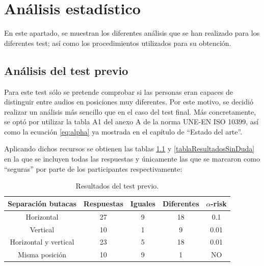 \documentclass[11pt,a4paper,twoside]{book}
\author{Víctor de Tejada Molera}
\begin{document}
\chapter{Análisis estadístico}    
    
    En este apartado, se muestran los diferentes análisis que se han realizado para los diferentes test; así como los procedimientos utilizados para su obtención.
        
    \section{Análisis del test previo}
        Para este test sólo se pretende comprobar si las personas eran capaces de distinguir entre audios en posiciones muy diferentes. Por este motivo, se decidió realizar un análisis más sencillo que en el caso del test final. Más concretamente, se optó por utilizar la tabla A1 del anexo A de la norma UNE-EN ISO 10399, así como la ecuación \ref{eq:alpha} ya mostrada en el capítulo de ``Estado del arte''.
            
        Aplicando dichos recursos se obtienen las tablas \ref{tablaResultadosDuda} y \ref{tablaResultadosSinDuda} en la que se incluyen todas las respuestas y únicamente las que se marcaron como ``seguras'' por parte de los participantes respectivamente:
            
        \begin{table}
	    \begin{center}
		\begin{scriptsize}
		\begin{tabular}{| c | c | c | c || c |}
			\hline
			\textbf{Separación butacas}&\textbf{Respuestas}&\textbf{Iguales}&\textbf{Diferentes}&\textbf{$\alpha$-risk}\\ \hline
            Horizontal&27&9&18&0.1\\ \hline
            Vertical&10&1&9&0.01\\ \hline
            Horizontal y vertical&23
            &5&18&0.01\\ \hline
            Misma posición&10&9&1&NO\\ \hline
		\end{tabular}
		\caption{Resultados del test previo.}
		\label{tablaResultadosDuda}
		\end{scriptsize}
		\end{center}	
		\end{table}	
		
\end{document}
